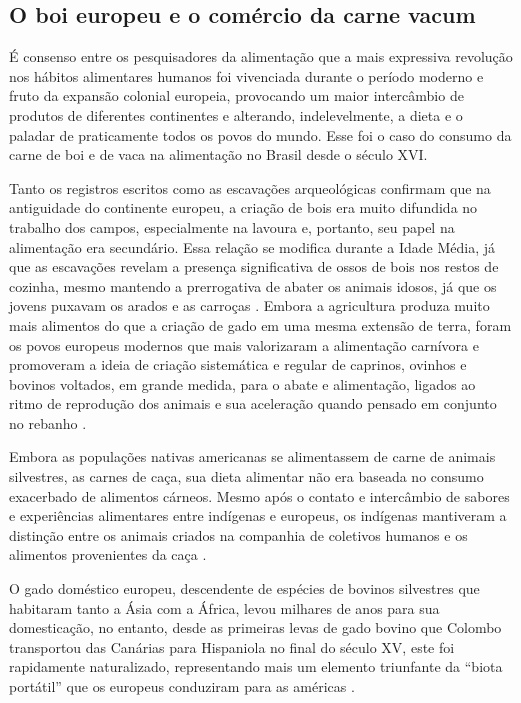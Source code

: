 \begin{refsection}
\section{O boi europeu e o comércio da carne vacum}

É consenso entre os pesquisadores da alimentação que a mais expressiva revolução nos hábitos alimentares humanos foi vivenciada durante o período moderno e fruto da expansão colonial europeia, provocando um maior intercâmbio de produtos de diferentes continentes e alterando, indelevelmente, a dieta e o paladar de praticamente todos os povos do mundo. Esse foi o caso do consumo da carne de boi e de vaca na alimentação no Brasil desde o século XVI.

Tanto os registros escritos como as escavações arqueológicas confirmam que na antiguidade do continente europeu, a criação de bois era muito difundida no trabalho dos campos, especialmente na lavoura e, portanto, seu papel na alimentação era secundário. Essa relação se modifica durante a Idade Média, já que as escavações revelam a presença significativa de ossos de bois nos restos de cozinha, mesmo mantendo a prerrogativa de abater os animais idosos, já que os jovens puxavam os arados e as carroças \cite{Flandrin1998historia}. Embora a agricultura produza muito mais alimentos do que a criação de gado em uma mesma extensão de terra, foram os povos europeus modernos que mais valorizaram a alimentação carnívora e promoveram a ideia de criação sistemática e regular de caprinos, ovinhos e bovinos voltados, em grande medida, para o abate e alimentação, ligados ao ritmo de reprodução dos animais e sua aceleração quando pensado em conjunto no rebanho \cite{Carneiro2003comida}.

Embora as populações nativas americanas se alimentassem de carne de animais silvestres, as carnes de caça, sua dieta alimentar não era baseada no consumo exacerbado de alimentos cárneos. Mesmo após o contato e intercâmbio de sabores e experiências alimentares entre indígenas e europeus, os indígenas mantiveram a distinção entre os animais criados na companhia de coletivos humanos e os alimentos provenientes da caça \cite{Velden2019tratados}.

O gado doméstico europeu, descendente de espécies de bovinos silvestres que habitaram tanto a Ásia com a África, levou milhares de anos para sua domesticação, no entanto, desde as primeiras levas de gado bovino que Colombo transportou das Canárias para Hispaniola no final do século XV, este foi rapidamente naturalizado, representando mais um elemento triunfante da ``biota portátil'' que os europeus conduziram para as américas \cite{Crosby1993imperialismo}.


\end{refsection}
